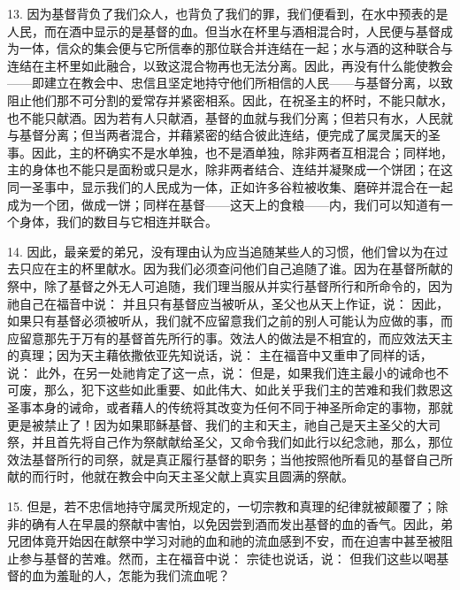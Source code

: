13. 因为基督背负了我们众人，也背负了我们的罪，我们便看到，在水中预表的是人民，而在酒中显示的是基督的血。但当水在杯里与酒相混合时，人民便与基督成为一体，信众的集会便与它所信奉的那位联合并连结在一起；水与酒的这种联合与连结在主杯里如此融合，以致这混合物再也无法分离。因此，再没有什么能使教会——即建立在教会中、忠信且坚定地持守他们所相信的人民——与基督分离，以致阻止他们那不可分割的爱常存并紧密相系。因此，在祝圣主的杯时，不能只献水，也不能只献酒。因为若有人只献酒，基督的血就与我们分离；但若只有水，人民就与基督分离；但当两者混合，并藉紧密的结合彼此连结，便完成了属灵属天的圣事。因此，主的杯确实不是水单独，也不是酒单独，除非两者互相混合；同样地，主的身体也不能只是面粉或只是水，除非两者结合、连结并凝聚成一个饼团；在这同一圣事中，显示我们的人民成为一体，正如许多谷粒被收集、磨碎并混合在一起成为一个团，做成一饼；同样在基督——这天上的食粮——内，我们可以知道有一个身体，我们的数目与它相连并联合。\par

14. 因此，最亲爱的弟兄，没有理由认为应当追随某些人的习惯，他们曾以为在过去只应在主的杯里献水。因为我们必须查问他们自己追随了谁。因为在基督所献的祭中，除了基督之外无人可追随，我们理当服从并实行基督所行和所命令的，因为祂自己在福音中说： 并且只有基督应当被听从，圣父也从天上作证，说： 因此，如果只有基督必须被听从，我们就不应留意我们之前的别人可能认为应做的事，而应留意那先于万有的基督首先所行的事。效法人的做法是不相宜的，而应效法天主的真理；因为天主藉依撒依亚先知说话，说： 主在福音中又重申了同样的话，说： 此外，在另一处祂肯定了这一点，说： 但是，如果我们连主最小的诫命也不可废，那么，犯下这些如此重要、如此伟大、如此关乎我们主的苦难和我们救恩这圣事本身的诫命，或者藉人的传统将其改变为任何不同于神圣所命定的事物，那就更是被禁止了！因为如果耶稣基督、我们的主和天主，祂自己是天主圣父的大司祭，并且首先将自己作为祭献献给圣父，又命令我们如此行以纪念祂，那么，那位效法基督所行的司祭，就是真正履行基督的职务；当他按照他所看见的基督自己所献的而行时，他就在教会中向天主圣父献上真实且圆满的祭献。\par

15. 但是，若不忠信地持守属灵所规定的，一切宗教和真理的纪律就被颠覆了；除非的确有人在早晨的祭献中害怕，以免因尝到酒而发出基督的血的香气。因此，弟兄团体竟开始因在献祭中学习对祂的血和祂的流血感到不安，而在迫害中甚至被阻止参与基督的苦难。然而，主在福音中说： 宗徒也说话，说： 但我们这些以喝基督的血为羞耻的人，怎能为我们流血呢？\par

